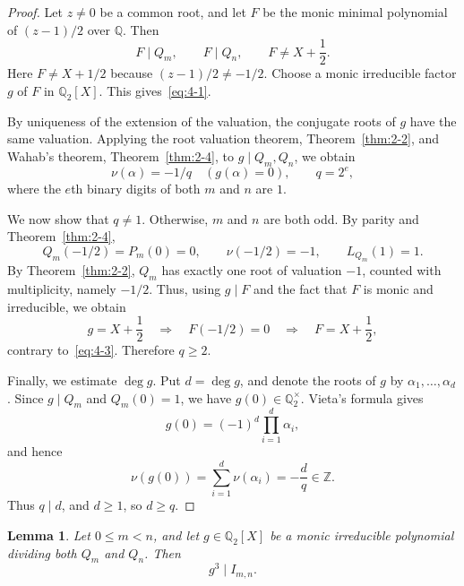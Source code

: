 \documentclass[11pt,a4paper]{article}
\numberwithin{equation}{section}
\newtheorem{lemma}[theorem]{Lemma}
\theoremstyle{definition}
\begin{document}
\begin{proof}
Let $z\ne0$ be a common root, and let $F$ be the monic minimal polynomial of $(z-1)/2$ over $\mathbb{Q}$. Then
\begin{equation}\label{eq:4-3}
F\mid Q_m,\qquad F\mid Q_n,\qquad F\ne X+\frac12.
\end{equation}
Here $F\ne X+1/2$ because $(z-1)/2\ne-1/2$. Choose a monic irreducible factor $g$ of $F$ in $\mathbb{Q}_2[X]$. This gives~\eqref{eq:4-1}.

By uniqueness of the extension of the valuation, the conjugate roots of $g$ have the same valuation. Applying the root valuation theorem, Theorem~\ref{thm:2-2}, and Wahab's theorem, Theorem~\ref{thm:2-4}, to $g\mid Q_m,Q_n$, we obtain
\[
\nu(\alpha)=-1/q\quad(g(\alpha)=0),\qquad q=2^e,
\]
where the $e$th binary digits of both $m$ and $n$ are $1$.

We now show that $q\ne1$. Otherwise, $m$ and $n$ are both odd. By parity and Theorem~\ref{thm:2-4},
\[
Q_m(-1/2)=P_m(0)=0,\qquad
\nu(-1/2)=-1,\qquad L_{Q_m}(1)=1.
\]
By Theorem~\ref{thm:2-2}, $Q_m$ has exactly one root of valuation $-1$, counted with multiplicity, namely $-1/2$. Thus, using $g\mid F$ and the fact that $F$ is monic and irreducible, we obtain
\[
g=X+\frac12
\quad\Longrightarrow\quad F(-1/2)=0
\quad\Longrightarrow\quad F=X+\frac12,
\]
contrary to~\eqref{eq:4-3}. Therefore $q\ge2$.

Finally, we estimate $\deg g$. Put $d=\deg g$, and denote the roots of $g$ by $\alpha_1,\ldots,\alpha_d$. Since $g\mid Q_m$ and $Q_m(0)=1$, we have $g(0)\in\mathbb{Q}_2^{\times}$. Vieta's formula gives
\[
g(0)=(-1)^d\prod_{i=1}^d\alpha_i,
\]
and hence
\begin{equation}\label{eq:4-4}
\nu(g(0))=\sum_{i=1}^d\nu(\alpha_i)=-\frac dq\in\mathbb{Z}.
\end{equation}
Thus $q\mid d$, and $d\ge1$, so $d\ge q$.
\end{proof}

\begin{lemma}\label{lem:4-2}
Let $0\le m<n$, and let $g\in\mathbb{Q}_2[X]$ be a monic irreducible polynomial dividing both $Q_m$ and $Q_n$. Then
\begin{equation}\label{eq:4-5}
g^3\mid I_{m,n}.
\end{equation}
\end{lemma}
\end{document}
